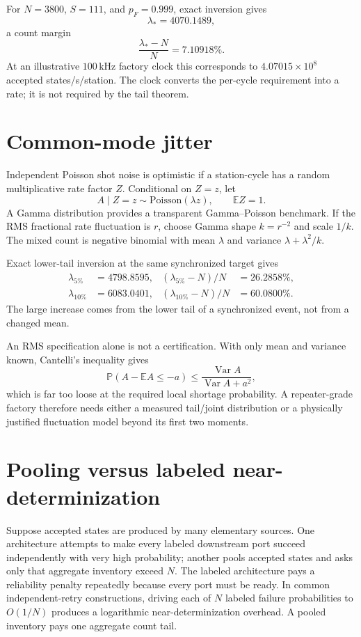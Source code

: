 \documentclass[aps,prx,reprint,superscriptaddress,nofootinbib,longbibliography,floatfix]{revtex4-2}
\newcommand{\E}{\mathbb E}\newcommand{\Prob}{\mathbb P}
\begin{document}
For $N=3800$, $S=111$, and $p_F=0.999$, exact inversion gives
\begin{equation}
\boxed{\lambda_*=4070.1489},
\end{equation}
a count margin
\begin{equation}
\frac{\lambda_*-N}{N}=7.10918\%.
\end{equation}
At an illustrative $100\,\mathrm{kHz}$ factory clock this corresponds to $4.07015\times10^8$ accepted states/s/station. The clock converts the per-cycle requirement into a rate; it is not required by the tail theorem.

\section{Common-mode jitter}
Independent Poisson shot noise is optimistic if a station-cycle has a random multiplicative rate factor $Z$. Conditional on $Z=z$, let
\begin{equation}
A\mid Z=z\sim\mathrm{Poisson}(\lambda z),\qquad \E Z=1.
\end{equation}
A Gamma distribution provides a transparent Gamma--Poisson benchmark. If the RMS fractional rate fluctuation is $r$, choose Gamma shape $k=r^{-2}$ and scale $1/k$. The mixed count is negative binomial with mean $\lambda$ and variance $\lambda+\lambda^2/k$.

Exact lower-tail inversion at the same synchronized target gives
\begin{align}
\lambda_{5\%}&=4798.8595, & (\lambda_{5\%}-N)/N&=26.2858\%,\\
\lambda_{10\%}&=6083.0401, & (\lambda_{10\%}-N)/N&=60.0800\%.
\end{align}
The large increase comes from the lower tail of a synchronized event, not from a changed mean.

An RMS specification alone is not a certification. With only mean and variance known, Cantelli's inequality gives
\begin{equation}
\Prob(A-\E A\le-a)\le\frac{\operatorname{Var}A}{\operatorname{Var}A+a^2},
\end{equation}
which is far too loose at the required local shortage probability. A repeater-grade factory therefore needs either a measured tail/joint distribution or a physically justified fluctuation model beyond its first two moments.

\section{Pooling versus labeled near-determinization}
Suppose accepted states are produced by many elementary sources. One architecture attempts to make every labeled downstream port succeed independently with very high probability; another pools accepted states and asks only that aggregate inventory exceed $N$. The labeled architecture pays a reliability penalty repeatedly because every port must be ready. In common independent-retry constructions, driving each of $N$ labeled failure probabilities to $O(1/N)$ produces a logarithmic near-determinization overhead. A pooled inventory pays one aggregate count tail.
\end{document}
